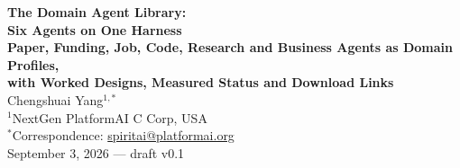 \documentclass[11pt]{article}
\theoremstyle{definition}
\begin{document}
\begin{center}
{\LARGE\bfseries The Domain Agent Library:}\\[6pt]
{\LARGE\bfseries Six Agents on One Harness}\\[8pt]
{\large\bfseries Paper, Funding, Job, Code, Research and Business Agents as Domain Profiles,\\[2pt]
with Worked Designs, Measured Status and Download Links}\\[16pt]
{\large Chengshuai Yang$^{1,*}$}\\[5pt]
{\normalsize $^{1}$NextGen PlatformAI C Corp, USA}\\[4pt]
{\normalsize $^{*}$Correspondence: \href{mailto:spiritai@platformai.org}{spiritai@platformai.org}}\\[10pt]
{\small September 3, 2026 --- draft v0.1}
\end{center}
\end{document}

